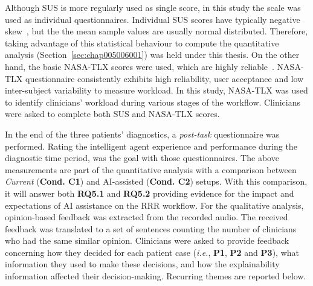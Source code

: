 


Although \ac{SUS} is more regularly used as single score, in this study the scale was used as individual questionnaires.
Individual \ac{SUS} scores have typically negative skew~\cite{lewis2018system}, but the the mean sample values are usually normal distributed.
Therefore, taking advantage of this statistical behaviour to compute the quantitative analysis (Section~\ref{sec:chap005006001}) was held under this thesis.
On the other hand, the basic \ac{NASA-TLX} scores were used, which are highly reliable~\cite{ramkumar2017using}.
\ac{NASA-TLX} questionnaire consistently exhibits high reliability, user acceptance and low inter-subject variability to measure workload.
In this study, \ac{NASA-TLX} was used to identify clinicians' workload during various stages of the workflow.
Clinicians were asked to complete both \ac{SUS} and \ac{NASA-TLX} scores.

In the end of the three patients' diagnostics, a {\it post-task} questionnaire was performed.
Rating the intelligent agent experience and performance during the diagnostic time period, was the goal with those questionnaires.
The above measurements are part of the quantitative analysis with a comparison between {\it Current} ({\bf Cond. C1}) and \ac{AI}-assisted ({\bf Cond. C2}) setups.
With this comparison, it will answer both {\bf RQ5.1} and {\bf RQ5.2} providing evidence for the impact and expectations of \ac{AI} assistance on the \ac{RRR} workflow.
For the qualitative analysis, opinion-based feedback was extracted from the recorded audio.
The received feedback was translated to a set of sentences counting the number of clinicians who had the same similar opinion.
Clinicians were asked to provide feedback concerning how they decided for each patient case ({\it i.e.}, {\bf P1}, {\bf P2} and {\bf P3}), what information they used to make these decisions, and how the explainability information affected their decision-making.
Recurring themes are reported below.

